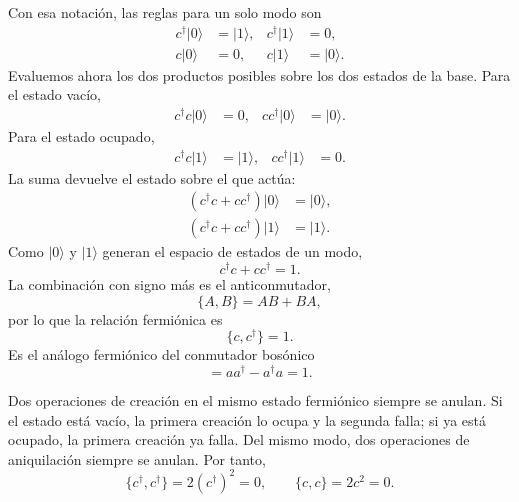 Con esa notación, las reglas para un solo modo son
\begin{align}
c^\dagger|0\rangle&=|1\rangle,
&c^\dagger|1\rangle&=0,
\\
c|0\rangle&=0,
&c|1\rangle&=|0\rangle.
\end{align}
Evaluemos ahora los dos productos posibles sobre los dos estados de la base. Para el estado vacío,
\begin{align}
c^\dagger c|0\rangle&=0,
&
cc^\dagger|0\rangle&=|0\rangle.
\end{align}
Para el estado ocupado,
\begin{align}
c^\dagger c|1\rangle&=|1\rangle,
&
cc^\dagger|1\rangle&=0.
\end{align}
La suma devuelve el estado sobre el que actúa:
\begin{align}
(c^\dagger c+cc^\dagger)|0\rangle&=|0\rangle,
\\
(c^\dagger c+cc^\dagger)|1\rangle&=|1\rangle.
\end{align}
Como \(|0\rangle\) y \(|1\rangle\) generan el espacio de estados de un modo,
\begin{equation}
c^\dagger c+cc^\dagger=1.
\end{equation}
La combinación con signo más es el anticonmutador,
\begin{equation}
\{A,B\}=AB+BA,
\end{equation}
por lo que la relación fermiónica es
\begin{equation}
\{c,c^\dagger\}=1.
\end{equation}
Es el análogo fermiónico del conmutador bosónico
\begin{equation}
[a,a^\dagger]=aa^\dagger-a^\dagger a=1.
\end{equation}

Dos operaciones de creación en el mismo estado fermiónico siempre se anulan. Si el estado está vacío, la primera creación lo ocupa y la segunda falla; si ya está ocupado, la primera creación ya falla. Del mismo modo, dos operaciones de aniquilación siempre se anulan. Por tanto,
\begin{equation}
\{c^\dagger,c^\dagger\}=2(c^\dagger)^2=0,
\qquad
\{c,c\}=2c^2=0.
\end{equation}

\begin{classroomqa}\end{classroomqa}

